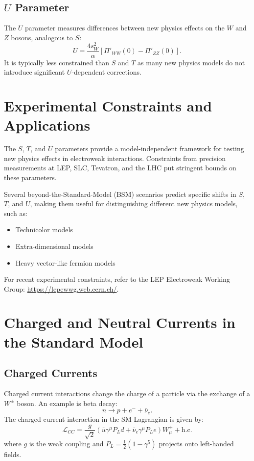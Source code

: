 \documentclass[a4paper,12pt]{article}
\begin{document}
\subsection{$U$ Parameter}
 
The $U$ parameter measures differences between new physics effects on the $W$ and $Z$ bosons, analogous to $S$:
\begin{equation}
U = \frac{4s_W^2}{\alpha} \left[ \Pi'_{WW}(0) - \Pi'_{ZZ}(0) \right].
\end{equation}
It is typically less constrained than $S$ and $T$ as many new physics models do not introduce significant $U$-dependent corrections.
 
\section{Experimental Constraints and Applications}
 
The $S$, $T$, and $U$ parameters provide a model-independent framework for testing new physics effects in electroweak interactions. Constraints from precision measurements at LEP, SLC, Tevatron, and the LHC put stringent bounds on these parameters.
 
Several beyond-the-Standard-Model (BSM) scenarios predict specific shifts in $S$, $T$, and $U$, making them useful for distinguishing different new physics models, such as:
\begin{itemize}
    \item Technicolor models
    \item Extra-dimensional models
    \item Heavy vector-like fermion models
\end{itemize}
 
For recent experimental constraints, refer to the LEP Electroweak Working Group: \url{https://lepewwg.web.cern.ch/}.
 
\section{Charged and Neutral Currents in the Standard Model}
 
\subsection{Charged Currents}
 
Charged current interactions change the charge of a particle via the exchange of a $W^\pm$ boson. An example is beta decay:
\begin{equation}
n \to p + e^- + \bar{\nu}_e.
\end{equation}
The charged current interaction in the SM Lagrangian is given by:
\begin{equation}
\mathcal{L}_{CC} = \frac{g}{\sqrt{2}} \left( \bar{u} \gamma^\mu P_L d + \bar{\nu}_e \gamma^\mu P_L e \right) W^+_\mu + \text{h.c.}
\end{equation}
where $g$ is the weak coupling and $P_L = \frac{1}{2} (1 - \gamma^5)$ projects onto left-handed fields.
 
\end{document}
